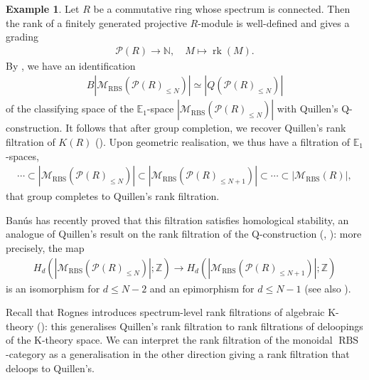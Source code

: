\documentclass[12pt, reqno]{amsart}
\theoremstyle{plain}
\theoremstyle{definition}
\newtheorem{example}[theorem]{Example}
\newcommand{\N}{\mathbb N}
\newcommand{\Z}{\mathbb Z}
\begin{document}
\begin{example}\label{rank filtration for commutative ring}
Let $R$ be a commutative ring whose spectrum is connected. Then the rank of a finitely generated projective $R$-module is well-defined and gives a grading
\begin{align*}
\mathcal{P}(R)\rightarrow \N, \quad M\mapsto \operatorname{rk}(M).
\end{align*}
By \cite[Theorem 7.38]{ClausenOrsnesJansen}, we have an identification
\begin{align*}
B|\mathscr{M}_{\operatorname{RBS}}(\mathcal{P}(R)_{\leq N})|\simeq |Q(\mathcal{P}(R)_{\leq N})|
\end{align*}
of the classifying space of the $\mathbb{E}_1$-space $|\mathscr{M}_{\operatorname{RBS}}(\mathcal{P}(R)_{\leq N})|$ with Quillen's Q-construction. It follows that after group completion, we recover Quillen's rank filtration of $K(R)$ (\cite{Quillen73a}). Upon geometric realisation, we thus have a filtration of $\mathbb{E}_1$-spaces,
\begin{align*}
\cdots \subset |\mathscr{M}_{\operatorname{RBS}}(\mathcal{P}(R)_{\leq N})|\subset |\mathscr{M}_{\operatorname{RBS}}(\mathcal{P}(R)_{\leq N+1})| \subset \cdots
 \subset |\mathscr{M}_{\operatorname{RBS}}(R)|,
\end{align*}
that group completes to Quillen's rank filtration.

Banús has recently proved that this filtration satisfies homological stability, an analogue of Quillen's result on the rank filtration of the Q-construction (\cite[Corollary 4.2.3]{Damia}, \cite[Corollary to Theorem 3]{Quillen73a}): more precisely, the map
\begin{align*}
H_d(|\mathscr{M}_{\operatorname{RBS}}(\mathcal{P}(R)_{\leq N})|;\Z)\longrightarrow H_d(|\mathscr{M}_{\operatorname{RBS}}(\mathcal{P}(R)_{\leq N+1})|; \Z)
\end{align*}
is an isomorphism for $d\leq N-2$ and an epimorphism for $d\leq N-1$ (see also ).

Recall that Rognes introduces spectrum-level rank filtrations of algebraic K-theory (\cite{Rognes}): this generalises Quillen's rank filtration to rank filtrations of deloopings of the K-theory space. We can interpret the rank filtration of the monoidal $\operatorname{RBS}$-category as a generalisation in the other direction giving a rank filtration that deloops to Quillen's.
\end{example}
\end{document}
